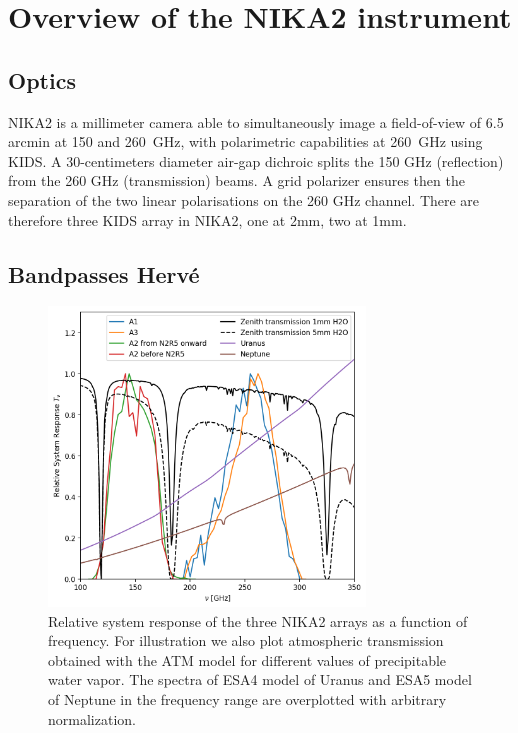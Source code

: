 
\section{Overview of the NIKA2 instrument}

\subsection{Optics}

NIKA2 is a millimeter camera able to simultaneously image a
field-of-view of 6.5\,arcmin at 150 and 260~GHz, with polarimetric
capabilities at 260~GHz using KIDS. A 30-centimeters diameter air-gap
dichroic splits the 150 GHz (reflection) from the 260 GHz
(transmission) beams.  A grid polarizer ensures then the separation of
the two linear polarisations on the 260 GHz channel.  There are
therefore three KIDS array in NIKA2, one at 2mm, two at 1mm. 


\subsection{Bandpasses {\color{blue} Herv\'e} }


\begin{figure}[ht!] %
\begin{center}
\includegraphics[width=0.75\textwidth]{Figures/SpectralBands/bandpasses_nika2.png}
\caption[NIKA2 transmission]{Relative system response of the three NIKA2 arrays as a
  function of frequency. For illustration we also plot atmospheric transmission obtained with the ATM model 
 \cite{ATM} for different values of precipitable water vapor. The spectra of ESA4 model of Uranus and ESA5 model of Neptune \cite{ESAmodel} in the frequency range are overplotted with arbitrary normalization.} 
 \label{spectralband1}
\end{center}
\end{figure}

